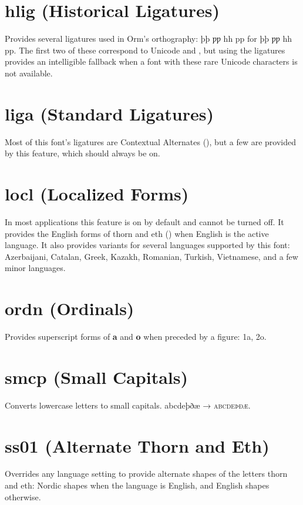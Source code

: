 \documentclass[12pt,letterpaper,openany]{book}
\begin{document}
\section{hlig (Historical Ligatures)}
Provides several ligatures used in Orm’s orthography:
{ þþ ƿƿ hh pp} for
{þþ ƿƿ hh pp}. The first two of these correspond
to Unicode  and , but using the ligatures provides an intelligible
fallback when a font with these rare Unicode characters is not available.

\section{liga (Standard Ligatures)}
Most of this font’s ligatures are Contextual Alternates (), but a few
are provided by this feature, which should always be on.

\section{locl (Localized Forms)}
In most applications this feature is on by default and cannot be turned off.
It provides the English forms of thorn and eth
(\textbf{}) when English is the
active language. It also provides variants for several languages supported by this font:
Azerbaijani, Catalan, Greek, Kazakh, Romanian, Turkish, Vietnamese, and a few minor
languages.

\section{ordn (Ordinals)}
Provides superscript forms of \textbf{a} and \textbf{o} when preceded by a figure:
{ 1a, 2o}.

\section{smcp (Small Capitals)}
Converts lowercase letters to small capitals. abcdeþðæ → \textsc{abcdeþðæ}.

\section{ss01 (Alternate Thorn and Eth)}
Overrides any language setting to provide alternate shapes of the letters thorn and eth: Nordic shapes when the language is English, and English shapes otherwise.
\end{document}
